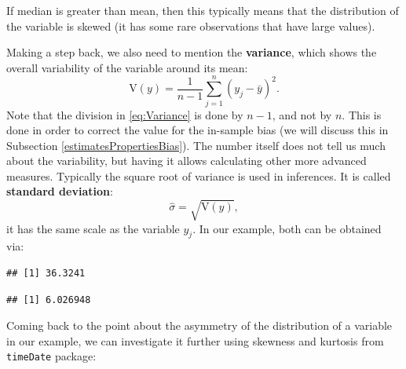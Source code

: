 \documentclass[
]{book}
\newenvironment{Shaded}{\begin{snugshade}}{\end{snugshade}}
\newcommand{\KeywordTok}[1]{\textcolor[rgb]{0.13,0.29,0.53}{\textbf{#1}}}
\newcommand{\NormalTok}[1]{#1}
\newcommand{\OperatorTok}[1]{\textcolor[rgb]{0.81,0.36,0.00}{\textbf{#1}}}
\theoremstyle{definition}
\theoremstyle{definition}
\theoremstyle{definition}
\theoremstyle{definition}
\theoremstyle{remark}
\begin{document}
If median is greater than mean, then this typically means that the distribution of the variable is skewed (it has some rare observations that have large values).

Making a step back, we also need to mention the \textbf{variance}, which shows the overall variability of the variable around its mean:
\begin{equation}
    \mathrm{V}(y)= \frac{1}{n-1}\sum_{j=1}^n (y_j - \bar{y})^2 .
    \label{eq:Variance}
\end{equation}
Note that the division in \eqref{eq:Variance} is done by \(n-1\), and not by \(n\). This is done in order to correct the value for the in-sample bias (we will discuss this in Subsection \ref{estimatesPropertiesBias}). The number itself does not tell us much about the variability, but having it allows calculating other more advanced measures. Typically the square root of variance is used in inferences. It is called \textbf{standard deviation}:
\begin{equation}
    \hat{\sigma} = \sqrt{\mathrm{V}(y)} ,
    \label{eq:StdDev}
\end{equation}
it has the same scale as the variable \(y_j\). In our example, both can be obtained via:

\begin{Shaded}
\end{Shaded}

\begin{verbatim}
## [1] 36.3241
\end{verbatim}

\begin{Shaded}
\end{Shaded}

\begin{verbatim}
## [1] 6.026948
\end{verbatim}

Coming back to the point about the asymmetry of the distribution of a variable in our example, we can investigate it further using skewness and kurtosis from \texttt{timeDate} package:

\begin{Shaded}
\end{Shaded}
\end{document}
